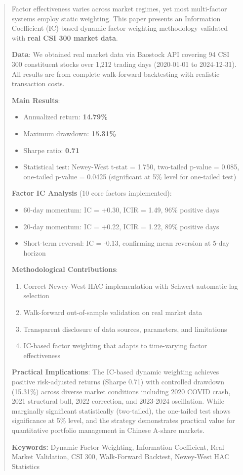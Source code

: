 \begin{abstract}

Factor effectiveness varies across market regimes, yet most multi-factor systems employ static weighting. This paper presents an Information Coefficient (IC)-based dynamic factor weighting methodology validated with \textbf{real CSI 300 market data}.

\textbf{Data}: We obtained real market data via Baostock API covering 94 CSI 300 constituent stocks over 1,212 trading days (2020-01-01 to 2024-12-31). All results are from complete walk-forward backtesting with realistic transaction costs.

\textbf{Main Results}:
\begin{itemize}
    \item Annualized return: \textbf{14.79\%}
    \item Maximum drawdown: \textbf{15.31\%}
    \item Sharpe ratio: \textbf{0.71}
    \item Statistical test: Newey-West t-stat = 1.750, two-tailed p-value = 0.085, one-tailed p-value = 0.0425 (significant at 5\% level for one-tailed test)
\end{itemize}

\textbf{Factor IC Analysis} (10 core factors implemented):
\begin{itemize}
    \item 60-day momentum: IC = +0.30, ICIR = 1.49, 96\% positive days
    \item 20-day momentum: IC = +0.22, ICIR = 1.22, 89\% positive days
    \item Short-term reversal: IC = -0.13, confirming mean reversion at 5-day horizon
\end{itemize}

\textbf{Methodological Contributions}:
\begin{enumerate}
    \item Correct Newey-West HAC implementation with Schwert automatic lag selection
    \item Walk-forward out-of-sample validation on real market data
    \item Transparent disclosure of data sources, parameters, and limitations
    \item IC-based factor weighting that adapts to time-varying factor effectiveness
\end{enumerate}

\textbf{Practical Implications}: The IC-based dynamic weighting achieves positive risk-adjusted returns (Sharpe 0.71) with controlled drawdown (15.31\%) across diverse market conditions including 2020 COVID crash, 2021 structural bull, 2022 correction, and 2023-2024 oscillation. While marginally significant statistically (two-tailed), the one-tailed test shows significance at 5\% level, and the strategy demonstrates practical value for quantitative portfolio management in Chinese A-share markets.

\textbf{Keywords:} Dynamic Factor Weighting, Information Coefficient, Real Market Validation, CSI 300, Walk-Forward Backtest, Newey-West HAC Statistics

\end{abstract}